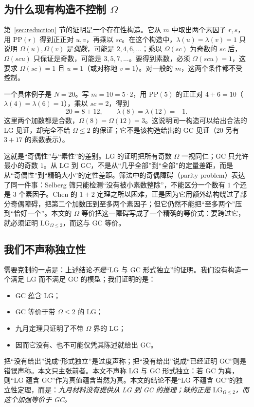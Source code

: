 \documentclass[11pt,a4paper]{ctexart}
\theoremstyle{plain}
\theoremstyle{definition}
\newcommand{\li}{\lambda}
\newcommand{\Om}{\Omega}
\newcommand{\LGtwo}{\mathrm{LG}_{\Om\le2}}
\newcommand{\PP}{\mathrm{PP}}
\begin{document}
\subsection{为什么现有构造不控制 $\Om$}
\label{sec:omega-loss}

第~\ref{sec:reduction} 节的证明是一个存在性构造。它从 $m$ 中取出两个素因子 $r,s$，用 $\PP(r)$ 得到正正对 $u,v$，再乘以 $sc$。在这个构造中，$\li(u)=\li(v)=1$ 只说明 $\Om(u),\Om(v)$ 是\emph{偶数}，可能是 $2,4,6,\dots$；乘以 $\Om(sc)$ 为奇数的 $sc$ 后，$\Om(scu)$ 只保证是奇数，可能是 $3,5,7,\dots$。要得到素数，必须 $\Om(scu)=1$，这要求 $\Om(sc)=1$ 且 $u=1$（或对称地 $v=1$）。对一般的 $m$，这两个条件都不受控制。

一个具体例子是 $N=20$。写 $m=10=5\cdot2$，用 $\PP(5)$ 的正正对 $4+6=10$（$\li(4)=\li(6)=1$），乘以 $sc=2$，得到
\[
  20=8+12,\qquad \li(8)=\li(12)=-1.
\]
这里两个加数都是合数，$\Om(8)=\Om(12)=3$。这说明同一构造可以给出合法的 LG 见证，却完全不给 $\Om\le2$ 的保证；它不是该构造给出的 GC 见证（$20$ 另有 $3+17$ 的素数表示）。

这就是“奇偶性”与“素性”的差别。LG 的证明把所有奇数 $\Om$ 一视同仁；GC 只允许最小的奇数 $1$。从 LG 到 GC，不是从“几乎全部”到“全部”的定量差距，而是从“奇偶性”到“精确大小”的定性差距。筛法中的奇偶障碍（parity problem）表达了同一件事：Selberg 筛只能检测“没有被小素数整除”，不能区分一个数有 $1$ 个还是 $3$ 个素因子\cite{montgomeryvaughan}。Chen 的 $1+2$ 定理之所以困难，正是因为它用额外结构绕过了部分奇偶障碍，把第二个加数压到至多两个素因子；但它仍然不能把“至多两个”压到“恰好一个”。本文的 $\Om$ 等价把这一障碍写成了一个精确的等价式：要跨过它，就必须证明 $\LGtwo$，而这与 GC 等价。

\subsection{我们不声称独立性}
\label{sec:no-independence}

需要克制的一点是：上述结论\emph{不是}“LG 与 GC 形式独立”的证明。我们没有构造一个满足 LG 而不满足 GC 的模型；我们证明的是：
\begin{itemize}
\item GC 蕴含 LG；
\item GC 等价于带 $\Om\le2$ 的 LG；
\item 九月定理只证明了不带 $\Om$ 界的 LG；
\item 因而它没有、也不可能仅凭其陈述就给出 GC。
\end{itemize}
把“没有给出”说成“形式独立”是过度声称；把“没有给出”说成“已经证明 GC”则是错误声称。本文只主张前者。本文不声称 LG 与 GC 形式独立：若 GC 为真，则“LG 蕴含 GC”作为真值蕴含当然为真。本文的结论不是“LG 不蕴含 GC”的独立性定理，而是：\emph{九月材料没有提供从 LG 到 GC 的推理；缺的正是 $\LGtwo$，而这个加强等价于 GC。}
\end{document}
